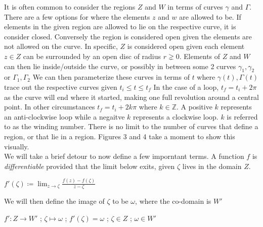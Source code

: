 \documentclass[a4paper,man,natbib]{apa6}
\newcommand{\Z}{\mathbb{Z}}  %
\begin{document}
It is often common to consider the regions $ Z $ and $ W $ in terms of curves $ \gamma $ and $ \Gamma $.
There are a few options for where the elements $ z $ and $ w $ are allowed to be. If elements in the given region are allowed to lie on the respective curve, it is consider closed.
Conversely the region is considered open given the elements are not allowed on the curve.
In specific, $ Z $ is considered open given each element $ z \in Z $ can be surrounded by an open disc of radius $ r \gneq  0 $.
Elements of $ Z $ and $ W $ can then lie inside/outside the curve, or possibly in between some 2 curves  $ \gamma_{1},\gamma_{2} $ or $ \Gamma_{1},\Gamma_{2} $
We can then parameterize these curves in terms of $ t $ where $ \gamma(t), \Gamma(t) $ trace out the respective curves given $ t_{i} \leq t \leq t_{f} $
In the case of a loop, $ t_{f} = t_{i} + 2\pi $ as the curve will end where it started, making one full revolution around a central point.
In other circumstances $ t_{f} = t_{i} + 2k\pi $ where $ k \in \Z $. A positive $ k $ represents an anti-clockwise loop while a negaitve $ k $ represents a clockwise loop.
$ k $ is referred to as the winding number. There is no limit to the number of curves that define a region, or that lie in a region.
Figures 3 and 4 take a moment to show this visually.
\\
We will take a brief detour to now define a few imporntant terms.
A function $ f $ is \textit{differentiable} provided that the limit below exits, given $ \zeta $ lives in the domain $ Z $.

\begin{center}

      $ f'(\zeta) \coloneqq \lim_{z \to \zeta} \frac{f(z) - f(\zeta)}{z - \zeta} $

\end{center}

We will then define the image of $ \zeta $ to be $ \omega $, where the co-domain is $ W' $

\begin{center}

      $ f': Z \to W' $ ; $ \zeta \mapsto \omega $ ; $ f'(\zeta) = \omega $ ; $ \zeta \in Z $ ; $ \omega \in W' $

\end{center}
\end{document}
